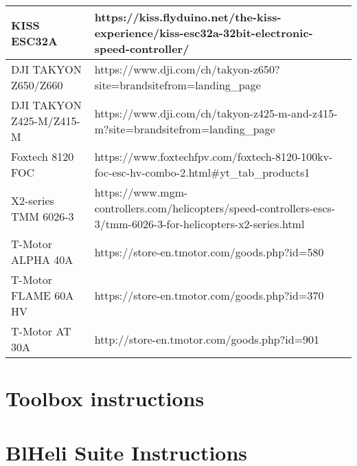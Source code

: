 \begin{table}
\begin{center}
{\begin{tabular}{lp{100mm}}
KISS ESC32A~                & https://kiss.flyduino.net/the-kiss-experience/kiss-esc32a-32bit-electronic-speed-controller/                                          \\ \hline
DJI TAKYON Z650/Z660        & https://www.dji.com/ch/takyon-z650?site=brandsitefrom=landing\_page                                                                   \\ \hline
DJI TAKYON Z425-M/Z415-M    & https://www.dji.com/ch/takyon-z425-m-and-z415-m?site=brandsitefrom=landing\_page                                                      \\ \hline
Foxtech 8120 FOC            & https://www.foxtechfpv.com/foxtech-8120-100kv-foc-esc-hv-combo-2.html\#yt\_tab\_products1                                             \\ \hline
X2-series TMM 6026-3        & https://www.mgm-controllers.com/helicopters/speed-controllers-escs-3/tmm-6026-3-for-helicopters-x2-series.html                        \\ \hline
T-Motor ALPHA 40A           & https://store-en.tmotor.com/goods.php?id=580                                                                                          \\ \hline
T-Motor FLAME 60A HV        & https://store-en.tmotor.com/goods.php?id=370                                                                                          \\ \hline
T-Motor AT 30A              & http://store-en.tmotor.com/goods.php?id=901                                                                                          
\end{tabular}
}
\end{center}
\end{table}


\chapter{Toolbox instructions}\label{sec:px4_instructions}

\chapter{BlHeli Suite Instructions} \label{sec:firm_blheli}